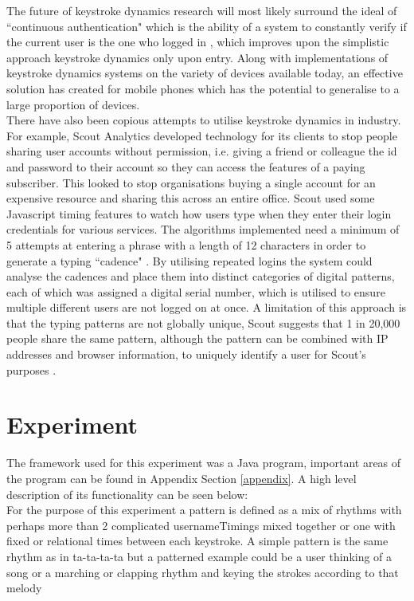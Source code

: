\documentclass{article}
\begin{document}
The future of keystroke dynamics research will most likely surround the ideal of ``continuous authentication" which is the ability of a system  to constantly verify if the current user is the one who logged in \parencite{sznur2015advances}, which improves upon the simplistic approach keystroke dynamics only upon entry. Along with implementations of keystroke dynamics systems on the variety of devices available today, an effective solution has created for mobile phones \parencite{maiorana2011keystroke} which has the potential to generalise to a large proportion of devices. \\ 

There have also been copious attempts to utilise keystroke dynamics in industry. For example, Scout Analytics developed technology for its clients to stop people sharing user accounts without permission, i.e. giving a friend or colleague the id and password to their account so they can access the features of a paying subscriber. This looked to stop organisations buying a single account for an expensive resource and sharing this across an entire office. Scout used some Javascript timing features to watch how users type when they enter their login credentials for various services. The algorithms implemented need a minimum of 5 attempts at entering a phrase with a length of 12 characters in order to generate a typing ``cadence" \parencite{arsTech}. By utilising repeated logins the system could analyse the cadences and place them into distinct categories of digital patterns, each of which was assigned a digital serial number, which is utilised to ensure multiple different users are not logged on at once. A limitation of this approach is that the typing patterns are not globally unique, Scout suggests that 1 in 20,000 people share the same pattern, although the pattern can be combined with IP addresses and browser information, to uniquely identify a user for Scout's purposes \parencite{arsTech}. 

\section{Experiment} \label{experiment}
The framework used for this experiment was a Java program, important areas of the program can be found in Appendix Section \ref{appendix}. A high level description of its functionality can be seen below: \\

For the purpose of this experiment a pattern is defined as a mix of rhythms with perhaps more than 2 complicated usernameTimings mixed together or one with fixed or relational times between each keystroke. A simple pattern is the same rhythm as in ta-ta-ta-ta but a patterned example could be a user thinking of a song or a marching or clapping rhythm and keying the strokes according to that melody
\end{document}
